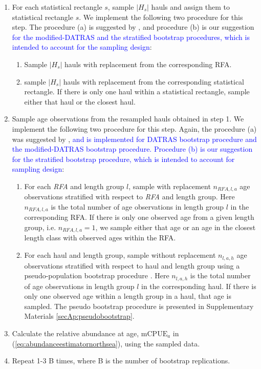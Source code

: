 \documentclass[a4paper 12pt]{article}
\numberwithin{equation}{section}
\newcommand{\nat}[1]{\textcolor{blue}{#1}}
\begin{document}
\begin{enumerate}
\item For each statistical rectangle $s$, sample $|H_s|$ hauls and assign them to statistical rectangle $s$. We implement the following two procedure for this step. The procedure (a) is suggested by \citep{ICES2006Report}, and procedure (b) is our suggestion \nat{for the modified-DATRAS and the stratified  bootstrap procedures, which is intended to account for the sampling design}: 
\begin{enumerate}
\item Sample $|H_s|$ hauls with replacement from the corresponding RFA.
\item sample $|H_s|$ hauls with replacement from the corresponding statistical rectangle. If there is only one haul within a statistical rectangle, sample either that haul or the closest haul.
\end{enumerate}
\item Sample age observations from the resampled hauls obtained in step 1. We implement the following two procedure for this step. Again, the procedure (a) was suggested by \citep{ICES2006Report}, \nat{and is implemented for DATRAS bootstrap procedure and the modified-DATRAS bootstrap procedure. Procedure (b) is our suggestion for the stratified bootstrap procedure, which is intended to account for sampling design}: 
\begin{enumerate}
\item For each \textit{RFA} and length group $l$, sample with replacement $n_{RFA,l,a}$ age observations stratified with respect to \textit{RFA} and length group. Here $n_{RFA,l,a}$ is the total number of age observations in length group $l$ in the corresponding RFA. If there is only one observed age from a given length group, i.e. $n_{RFA,l,a} = 1$, we sample either that age or an age in the closest length class with observed ages within the RFA.
\item For each haul and length group, sample without replacement  $n_{l,a,h}$ age observations stratified with respect to haul and length group using a pseudo-population bootstrap procedure \citep{mashreghi2016survey}. Here $n_{l,a,h}$ is the total number of age observations in length group $l$ in the corresponding haul. If there is only one observed age within a length group in a haul, that age is sampled. The pseudo bootstrap procedure is presented in Supplementary Materials \ref{secAp:pseudobootstrap}. 

\end{enumerate}
\item Calculate the relative abundance at age, $\text{mCPUE}_a$ in (\ref{eq:abundanceestimatornorthsea}), using the sampled data.
\item Repeat 1-3 B times, where B is the number of bootstrap replications.
\end{enumerate}
\end{document}
